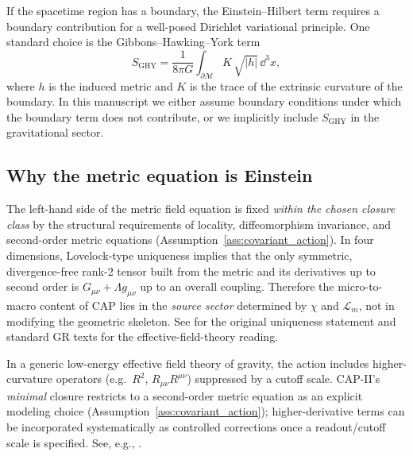 \begin{remark}
\label{rem:ghy_term}
If the spacetime region has a boundary, the Einstein--Hilbert term requires a boundary contribution for a well-posed Dirichlet variational principle.
One standard choice is the Gibbons--Hawking--York term \cite{York1972,GibbonsHawking1977}
\begin{equation}
  S_{\mathrm{GHY}}
  = \frac{1}{8\pi G}\int_{\partial\mathcal{M}} K\,\sqrt{|h|}\,\dd^3x,
\end{equation}
where $h$ is the induced metric and $K$ is the trace of the extrinsic curvature of the boundary.
In this manuscript we either assume boundary conditions under which the boundary term does not contribute, or we implicitly include $S_{\mathrm{GHY}}$ in the gravitational sector.
\end{remark}

\subsection{Why the metric equation is Einstein}
\label{subsec:einstein_uniqueness}

The left-hand side of the metric field equation is fixed \emph{within the chosen closure class} by the structural requirements of locality, diffeomorphism invariance, and second-order metric equations (Assumption~\ref{ass:covariant_action}).
In four dimensions, Lovelock-type uniqueness implies that the only symmetric, divergence-free rank-2 tensor built from the metric and its derivatives up to second order is $G_{\mu\nu}+\Lambda g_{\mu\nu}$ up to an overall coupling.
Therefore the micro-to-macro content of CAP lies in the \emph{source sector} determined by $\chi$ and $\mathcal{L}_m$, not in modifying the geometric skeleton.
See \cite{Lovelock1971} for the original uniqueness statement and standard GR texts for the effective-field-theory reading.

\begin{remark}
\label{rem:eft_corrections}
In a generic low-energy effective field theory of gravity, the action includes higher-curvature operators (e.g.\ $R^2$, $R_{\mu\nu}R^{\mu\nu}$) suppressed by a cutoff scale.
CAP-II's \emph{minimal} closure restricts to a second-order metric equation as an explicit modeling choice (Assumption~\ref{ass:covariant_action}); higher-derivative terms can be incorporated systematically as controlled corrections once a readout/cutoff scale is specified.
See, e.g., \cite{Donoghue1994,Burgess2004}.
\end{remark}

